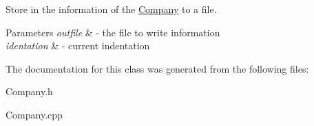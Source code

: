 Store in the information of the \mbox{\hyperlink{class_company}{Company}} to a file. 


\begin{DoxyParams}{Parameters}
{\em outfile} & -\/ the file to write information \\
\hline
{\em identation} & -\/ current indentation \\
\hline
\end{DoxyParams}


The documentation for this class was generated from the following files\+:\begin{DoxyCompactItemize}
\item 
Company.\+h\item 
Company.\+cpp\end{DoxyCompactItemize}
